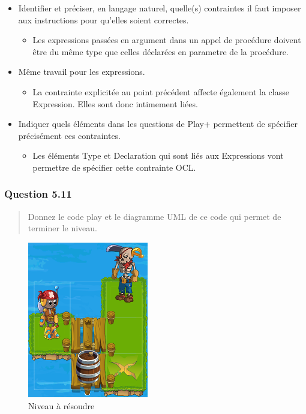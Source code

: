 \documentclass[]{article}
\providecommand{\tightlist}{%
  \setlength{\itemsep}{0pt}\setlength{\parskip}{0pt}}
\begin{document}
\begin{itemize}
\item
  Identifier et préciser, en langage naturel, quelle(s) contraintes il
  faut imposer aux instructions pour qu'elles soient correctes.

  \begin{itemize}
  \tightlist
  \item
    Les expressions passées en argument dans un appel de procédure
    doivent être du même type que celles déclarées en parametre de la
    procédure.
  \end{itemize}
\item
  Même travail pour les expressions.

  \begin{itemize}
  \tightlist
  \item
    La contrainte explicitée au point précédent affecte également la
    classe Expression. Elles sont donc intimement liées.
  \end{itemize}
\item
  Indiquer quels éléments dans les questions de Play+ permettent de
  spécifier précisément ces contraintes.

  \begin{itemize}
  \tightlist
  \item
    Les éléments Type et Declaration qui sont liés aux Expressions vont
    permettre de spécifier cette contrainte OCL.
  \end{itemize}
\end{itemize}

\hypertarget{question-5.11}{%
\subsubsection{Question 5.11}\label{question-5.11}}

\begin{quote}
Donnez le code play et le diagramme UML de ce code qui permet de
terminer le niveau.
\end{quote}

\begin{figure}
\centering
\includegraphics{./images_final/Niveau2.png}
\caption{Niveau à résoudre}
\end{figure}
\end{document}
